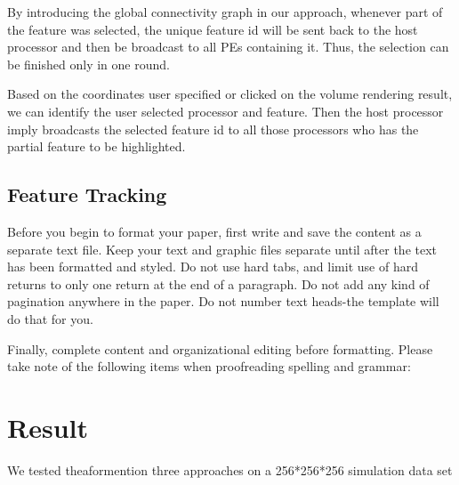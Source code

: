 \documentclass[10pt, conference, compsocconf]{IEEEtran}
\begin{document}
By introducing the global connectivity graph in our approach, whenever part of the feature was selected, the unique feature id will be sent back to the host processor and then be broadcast to all PEs containing it. Thus, the selection can be finished only in one round.

Based on the coordinates user specified or clicked on the volume rendering result, 
we can identify the user selected processor and feature.
Then the host processor imply broadcasts the selected feature id to all those processors who has the partial feature to be highlighted.


\subsection{Feature Tracking}
Before you begin to format your paper, first write and save the content as a separate text file. Keep your text and graphic files separate until after the text has been formatted and styled. Do not use hard tabs, and limit use of hard returns to only one return at the end of a paragraph. Do not add any kind of pagination anywhere in the paper. Do not number text heads-the template will do that for you.

Finally, complete content and organizational editing before formatting. Please take note of the following items when proofreading spelling and grammar:

\section{Result}
We tested theaformention three approaches on a 256*256*256 simulation data set
\end{document}
